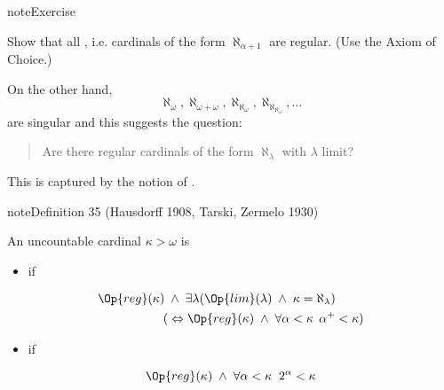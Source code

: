 \documentclass[letterpaper,10pt,english]{jupyterBook}
\begin{document}
\begin{sphinxadmonition}{note}{Exercise}

\sphinxAtStartPar
Show that all , i.e. cardinals of the form \(\aleph_{\alpha+1}\) are regular. (Use the Axiom of Choice.)
\end{sphinxadmonition}

\sphinxAtStartPar
On the other hand,
\begin{equation*}
\aleph_\omega,  \aleph_{\omega+\omega}, \aleph_{\aleph_{\omega}}, \aleph_{\aleph_{\aleph_\omega}}, \ldots
\end{equation*}
\sphinxAtStartPar
are singular and this suggests the question:
\begin{quote}

\sphinxAtStartPar
Are there regular cardinals of the form \(\aleph_\lambda\) with \(\lambda\) limit?
\end{quote}

\sphinxAtStartPar
This is captured by the notion of .
\label{large_cardinals:def-inaccessible}
\begin{sphinxadmonition}{note}{Definition 35 (Hausdorff 1908, Tarski, Zermelo 1930)}



\sphinxAtStartPar
An uncountable cardinal \(\kappa > \omega\) is
\begin{itemize}
\item {} 
\sphinxAtStartPar
{} if

\end{itemize}
\begin{align*}
    \Op{reg}(\kappa) \; &  \wedge \;  \exists \lambda (\Op{lim}(\lambda) \;  \wedge\;  \kappa = \aleph_\lambda)\\
                        (& \Leftrightarrow \Op{reg}(\kappa) \;  \wedge \;  \forall \alpha < \kappa \; \, \alpha^+ < \kappa)
\end{align*}\begin{itemize}
\item {} 
\sphinxAtStartPar
{} if

\end{itemize}
\begin{equation*}
    \Op{reg}(\kappa) \;  \wedge \;  \forall \alpha < \kappa \;\; 2^{\alpha} < \kappa
\end{equation*}\end{sphinxadmonition}
\end{document}
